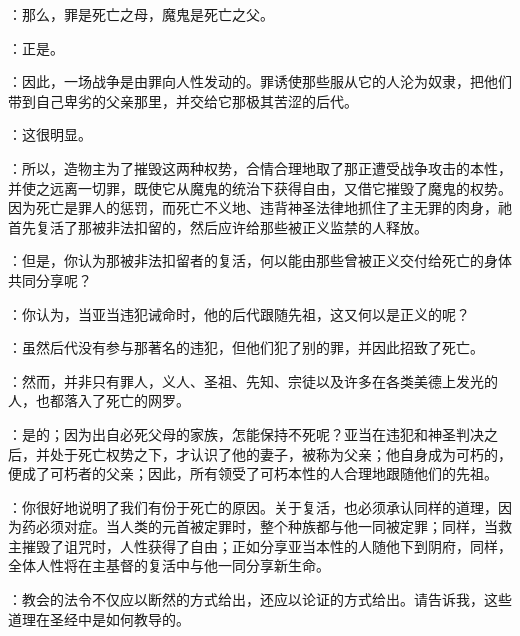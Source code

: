 ：那么，罪是死亡之母，魔鬼是死亡之父。\par

：正是。\par

：因此，一场战争是由罪向人性发动的。罪诱使那些服从它的人沦为奴隶，把他们带到自己卑劣的父亲那里，并交给它那极其苦涩的后代。\par

：这很明显。\par

：所以，造物主为了摧毁这两种权势，合情合理地取了那正遭受战争攻击的本性，并使之远离一切罪，既使它从魔鬼的统治下获得自由，又借它摧毁了魔鬼的权势。因为死亡是罪人的惩罚，而死亡不义地、违背神圣法律地抓住了主无罪的肉身，祂首先复活了那被非法扣留的，然后应许给那些被正义监禁的人释放。\par

：但是，你认为那被非法扣留者的复活，何以能由那些曾被正义交付给死亡的身体共同分享呢？\par

：你认为，当亚当违犯诫命时，他的后代跟随先祖，这又何以是正义的呢？\par

：虽然后代没有参与那著名的违犯，但他们犯了别的罪，并因此招致了死亡。\par

：然而，并非只有罪人，义人、圣祖、先知、宗徒以及许多在各类美德上发光的人，也都落入了死亡的网罗。\par

：是的；因为出自必死父母的家族，怎能保持不死呢？亚当在违犯和神圣判决之后，并处于死亡权势之下，才认识了他的妻子，被称为父亲；他自身成为可朽的，便成了可朽者的父亲；因此，所有领受了可朽本性的人合理地跟随他们的先祖。\par

：你很好地说明了我们有份于死亡的原因。关于复活，也必须承认同样的道理，因为药必须对症。当人类的元首被定罪时，整个种族都与他一同被定罪；同样，当救主摧毁了诅咒时，人性获得了自由；正如分享亚当本性的人随他下到阴府，同样，全体人性将在主基督的复活中与他一同分享新生命。\par

：教会的法令不仅应以断然的方式给出，还应以论证的方式给出。请告诉我，这些道理在圣经中是如何教导的。\par

